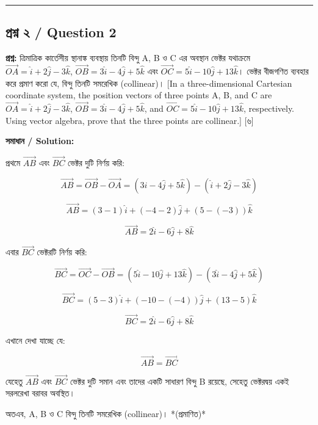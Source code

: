 \documentclass[11pt, a4paper]{article}
\begin{document}
\vspace{1em}
\noindent\rule{\textwidth}{0.4pt}
\vspace{1em}

\subsection*{প্রশ্ন ২ / Question 2}
\textbf{প্রশ্ন:} ত্রিমাত্রিক কার্তেসীয় স্থানাঙ্ক ব্যবস্থায় তিনটি বিন্দু A, B ও C এর অবস্থান ভেক্টর যথাক্রমে $\vec{OA} = \hat{i} + 2\hat{j} - 3\hat{k}$, $\vec{OB} = 3\hat{i} - 4\hat{j} + 5\hat{k}$ এবং $\vec{OC} = 5\hat{i} - 10\hat{j} + 13\hat{k}$। ভেক্টর বীজগণিত ব্যবহার করে প্রমাণ করো যে, বিন্দু তিনটি সমরেখিক (collinear)। [In a three-dimensional Cartesian coordinate system, the position vectors of three points A, B, and C are $\vec{OA} = \hat{i} + 2\hat{j} - 3\hat{k}$, $\vec{OB} = 3\hat{i} - 4\hat{j} + 5\hat{k}$, and $\vec{OC} = 5\hat{i} - 10\hat{j} + 13\hat{k}$, respectively. Using vector algebra, prove that the three points are collinear.] [৬]

\vspace{0.8em}
\textbf{সমাধান / Solution:}

প্রথমে $\vec{AB}$ এবং $\vec{BC}$ ভেক্টর দুটি নির্ণয় করি:

$$\vec{AB} = \vec{OB} - \vec{OA} = (3\hat{i} - 4\hat{j} + 5\hat{k}) - (\hat{i} + 2\hat{j} - 3\hat{k})$$

$$\vec{AB} = (3-1)\hat{i} + (-4-2)\hat{j} + (5 - (-3))\hat{k}$$

$$\vec{AB} = 2\hat{i} - 6\hat{j} + 8\hat{k}$$

এবার $\vec{BC}$ ভেক্টরটি নির্ণয় করি:

$$\vec{BC} = \vec{OC} - \vec{OB} = (5\hat{i} - 10\hat{j} + 13\hat{k}) - (3\hat{i} - 4\hat{j} + 5\hat{k})$$

$$\vec{BC} = (5-3)\hat{i} + (-10 - (-4))\hat{j} + (13-5)\hat{k}$$

$$\vec{BC} = 2\hat{i} - 6\hat{j} + 8\hat{k}$$

এখানে দেখা যাচ্ছে যে:

$$\vec{AB} = \vec{BC}$$

যেহেতু $\vec{AB}$ এবং $\vec{BC}$ ভেক্টর দুটি সমান এবং তাদের একটি সাধারণ বিন্দু B রয়েছে, সেহেতু ভেক্টরদ্বয় একই সরলরেখা বরাবর অবস্থিত।

অতএব, A, B ও C বিন্দু তিনটি সমরেখিক (collinear)। *(প্রমাণিত)*
\end{document}
